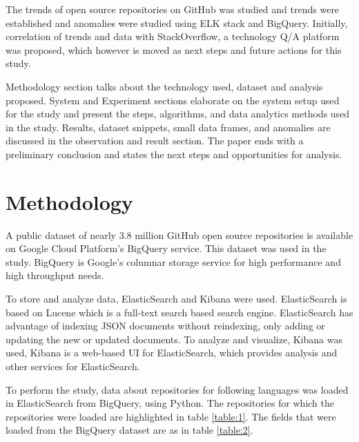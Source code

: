 \documentclass[12pt,conference]{IEEEtran}
\begin{document}
The trends of open source repositories on GitHub was studied and trends were established and anomalies were studied using ELK stack and BigQuery. Initially, correlation of trends and data with StackOverflow, a technology Q/A platform was proposed, which however is moved as next steps and future actions for this study. 

Methodology section talks about the technology used, dataset and analysis proposed. System and Experiment sections elaborate on the system setup used for the study and present the steps, algorithms, and data analytics methods used in the study. Results, dataset snippets, small data frames, and anomalies are discussed in the observation and result section. The paper ends with a preliminary conclusion and states the next steps and opportunities for analysis.



\section{Methodology}

A public dataset of nearly 3.8 million GitHub open source repositories\cite{gcp} is available on Google Cloud Platform's BigQuery service. This dataset was used in the study. BigQuery is Google's columnar storage service for high performance and high throughput needs. 

To store and analyze data, ElasticSearch and Kibana were used. ElasticSearch is based on Lucene which is a full-text search based search engine. ElasticSearch has advantage of indexing JSON documents without reindexing, only adding or updating the new or updated documents. To analyze and visualize, Kibana was used, Kibana is a web-based UI for ElasticSearch, which provides analysis and other services for ElasticSearch. 

To perform the study, data about repositories for following languages was loaded in ElasticSearch from BigQuery, using Python. The repositories for which the repositories were loaded are highlighted in table \ref{table:1}. The fields that were loaded from the BigQuery dataset are as in table \ref{table:2}. 
\end{document}
